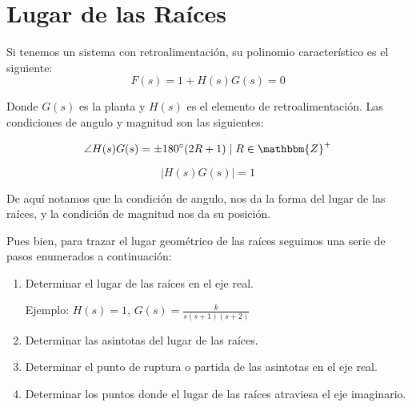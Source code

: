 
\chapter{Lugar de las Raíces}
Si tenemos un sistema con retroalimentación, su polinomio característico es el siguiente:
\begin{equation}
F(s) = 1 + H(s) G(s) = 0
\end{equation}

Donde $G(s)$ es la planta y $H(s)$ es el elemento de retroalimentación. Las condiciones de angulo y magnitud son las siguientes:

\begin{equation}
\angle H(s) G(s) = \pm 180^{\circ} (2R + 1) \mid R \in \mathbbm{Z}^+
\end{equation}

\begin{equation}
\lvert H(s) G(s) \rvert = 1
\end{equation}

De aquí notamos que la condición de angulo, nos da la forma del lugar de las raíces, y la condición de magnitud nos da su posición.

Pues bien, para trazar el lugar geométrico de las raíces seguimos una serie de pasos enumerados a continuación:

\begin{enumerate}
\item
Determinar el lugar de las raíces en el eje real.

Ejemplo: $H(s) = 1$, $G(s) = \frac{k}{s(s+1)(s+2)}$


\item
Determinar las asintotas del lugar de las raíces.
\item
Determinar el punto de ruptura o partida de las asintotas en el eje real.
\item
Determinar los puntos donde el lugar de las raíces atraviesa el eje imaginario.
\end{enumerate}
